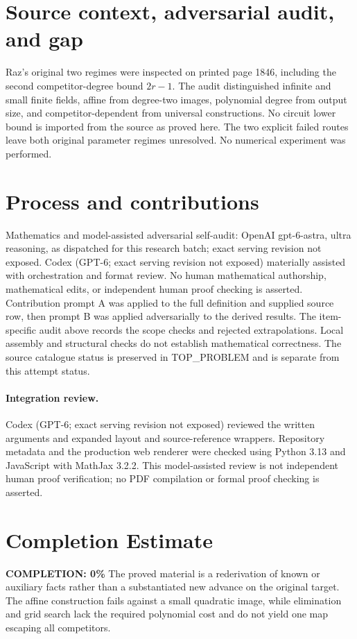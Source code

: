 \documentclass[11pt]{article}
\begin{document}
\section{Source context, adversarial audit, and gap}
Raz's original two regimes were inspected on printed page 1846, including
the second competitor-degree bound $2r-1$. The audit distinguished infinite
and small finite fields, affine from degree-two images, polynomial degree
from output size, and competitor-dependent from universal constructions.
No circuit lower bound is imported from the source as proved here. The two
explicit failed routes leave both original parameter regimes unresolved.
No numerical experiment was performed.

\section{Process and contributions}
Mathematics and model-assisted adversarial self-audit: OpenAI gpt-6-astra, ultra reasoning, as dispatched for this research batch; exact serving revision not exposed. Codex (GPT-6; exact serving revision not exposed) materially assisted with orchestration and format review. No human mathematical authorship, mathematical edits, or independent human proof checking is asserted.
Contribution prompt A was applied to the full definition and supplied source row, then prompt B was applied adversarially to the derived results. The item-specific audit above records the scope checks and rejected extrapolations. Local assembly and structural checks do not establish mathematical correctness. The source catalogue status is preserved in TOP\_PROBLEM and is separate from this attempt status.
\paragraph{Integration review.} Codex (GPT-6; exact serving revision not exposed) reviewed the written arguments and expanded layout and source-reference wrappers. Repository metadata and the production web renderer were checked using Python 3.13 and JavaScript with MathJax 3.2.2. This model-assisted review is not independent human proof verification; no PDF compilation or formal proof checking is asserted.

\section{Completion Estimate}
\noindent\textbf{COMPLETION: 0\%}
The proved material is a rederivation of known or auxiliary facts rather than a substantiated new advance on the original target. The affine construction fails against a small quadratic image, while elimination and grid search lack the required polynomial cost and do not yield one map escaping all competitors.
\end{document}
